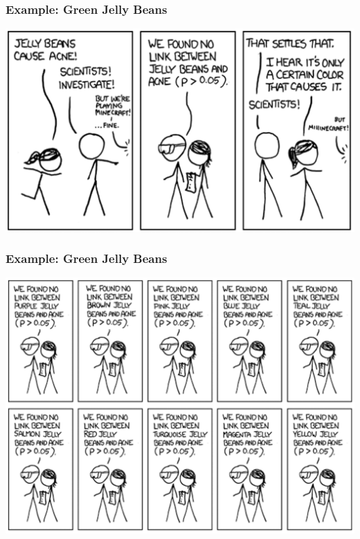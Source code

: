 \documentclass[10pt, block=fill]{beamer}
\begin{document}
\begin{frame}
  \frametitle{Example: Green Jelly Beans}

  \begin{center}
  \includegraphics[width=0.9\linewidth]{figures/jelly_beans_1.png}  
  \end{center}

\end{frame}


\begin{frame}
  \frametitle{Example: Green Jelly Beans}

  \begin{center}
  \includegraphics[width=0.9\linewidth]{figures/jelly_beans_2.png}  
  \end{center}

\end{frame}
\end{document}
